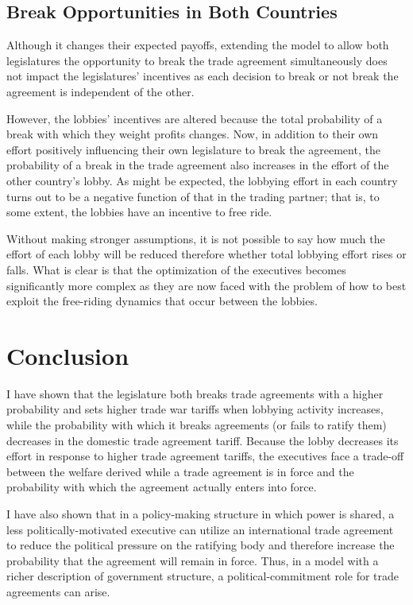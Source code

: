 \documentclass[10pt]{article}
\begin{document}
\subsection{Break Opportunities in Both Countries}
\label{sec:two}
Although it changes their expected payoffs, extending the model to allow both legislatures the opportunity to break the trade agreement simultaneously does not impact the legislatures' incentives as each decision to break or not break the agreement is independent of the other.

However, the lobbies' incentives are altered because the total probability of a break with which they weight profits changes. Now, in addition to their own effort positively influencing their own legislature to break the agreement, the probability of a break in the trade agreement also increases in the effort of the other country's lobby. As might be expected, the lobbying effort in each country turns out to be a negative function of that in the trading partner; that is, to some extent, the lobbies have an incentive to free ride.

Without making stronger assumptions, it is not possible to say how much the effort of each lobby will be reduced therefore whether total lobbying effort rises or falls. What is clear is that the optimization of the executives becomes significantly more complex as they are now faced with the problem of how to best exploit the free-riding dynamics that occur between the lobbies. 


\section{Conclusion}
\label{sec:concl}
I have shown that the legislature both breaks trade agreements with a higher probability and sets higher trade war tariffs when lobbying activity increases, while the probability with which it breaks agreements (or fails to ratify them) decreases in the domestic trade agreement tariff. Because the lobby decreases its effort in response to higher trade agreement tariffs, the executives face a trade-off between the welfare derived while a trade agreement is in force and the probability with which the agreement actually enters into force.

I have also shown that in a policy-making structure in which power is shared, a less politically-motivated executive can utilize an international trade agreement to reduce the political pressure on the ratifying body and therefore increase the probability that the agreement will remain in force. Thus, in a model with a richer description of government structure, a political-commitment role for trade agreements can arise.
\end{document}
